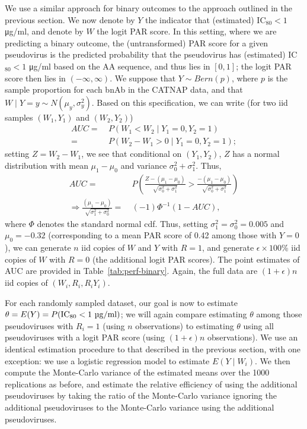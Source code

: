 \documentclass[10pt]{article}
\begin{document}
We use a similar approach for binary outcomes to the approach outlined in the previous section. We now denote by $Y$ the indicator that (estimated) IC$_{80} < 1$ \si{\ug}/ml, and denote by $W$ the logit PAR score. In this setting, where we are predicting a binary outcome, the (untransformed) PAR score for a given pseudovirus is the predicted probability that the pseudovirus has (estimated) IC$_{80} < 1$ \si{\ug}/ml based on the AA sequence, and thus lies in $[0,1]$; the logit PAR score then lies in $(-\infty, \infty)$. We suppose that $Y \sim Bern(p)$, where $p$ is the sample proportion for each bnAb in the CATNAP data, and that $W \mid Y = y \sim N(\mu_y, \sigma^2_y)$. Based on this specification, we can write (for two iid samples $(W_1, Y_1)$ and $(W_2, Y_2)$)
\begin{align*}
    AUC =& \ P(W_1 < W_2 \mid Y_1 = 0, Y_2 = 1) \\
    =& \ P(W_2 - W_1 > 0 \mid Y_1 = 0, Y_2 = 1);
\end{align*}
setting $Z = W_2 - W_1$, we see that conditional on $(Y_1, Y_2)$, $Z$ has a normal distribution with mean $\mu_1 - \mu_0$ and variance $\sigma^2_0 + \sigma^2_1$. Thus,
\begin{align*}
    AUC =& \ P\left(\frac{Z - (\mu_1 - \mu_0)}{\sqrt{\sigma^2_0 + \sigma^2_1}} > \frac{- (\mu_1 - \mu_0)}{\sqrt{\sigma^2_0 + \sigma^2_1}}\right) \\
    \Rightarrow \frac{(\mu_1 - \mu_0)}{\sqrt{\sigma^2_1 + \sigma^2_0}} =& \ (-1)\Phi^{-1}(1 - AUC),
\end{align*}
where $\Phi$ denotes the standard normal cdf. Thus, setting $\sigma^2_1 = \sigma^2_0 = 0.005$ and $\mu_0 = -0.32$ (corresponding to a mean PAR score of 0.42 among those with $Y = 0$), we can generate $n$ iid copies of $W$ and $Y$ with $R = 1$, and generate $\epsilon \times 100$\% iid copies of $W$ with $R = 0$ (the additional logit PAR scores). The point estimates of AUC are provided in Table~\ref{tab:perf-binary}. Again, the full data are $(1 + \epsilon)n$ iid copies of $(W_i, R_i, R_iY_i)$.

For each randomly sampled dataset, our goal is now to estimate $\theta = E(Y) = P(\text{IC}_{80} < 1\text{ \si{\ug}/ml})$; we will again compare estimating $\theta$ among those pseudoviruses with $R_i = 1$ (using $n$ observations) to estimating $\theta$ using all pseudoviruses with a logit PAR score (using $(1+\epsilon)n$ observations). We use an identical estimation procedure to that described in the previous section, with one exception: we use a logistic regression model to estimate $E(Y \mid W_i)$. We then compute the Monte-Carlo variance of the estimated means over the 1000 replications as before, and estimate the relative efficiency of using the additional pseudoviruses by taking the ratio of the Monte-Carlo variance ignoring the additional pseudoviruses to the Monte-Carlo variance using the additional pseudoviruses.
\end{document}
